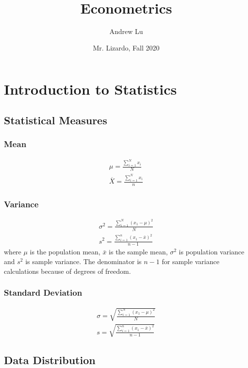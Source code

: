 \documentclass[12pt]{article}
\title{Econometrics}
\author{Andrew Lu}
\date{Mr. Lizardo, Fall 2020}
\numberwithin{equation}{section}
\begin{document}
    \maketitle
    \label{sec:top}
    \tableofcontents

\section{Introduction to Statistics}

\subsection{Statistical Measures}
\subsubsection{Mean}
\begin{align}
    \mu=\frac{\sum\limits_{i=1}^{N}{x_i}}{N} \\
    \overline{X}=\frac{\sum\limits_{i=1}^{N}{x_i}}{n}
\end{align}

\subsubsection{Variance}
\begin{align}
    \sigma^2=\frac{\sum\limits_{i=1}^{N}{(x_1-\mu)^2}}{N} \\
    s^2=\frac{\sum\limits_{i=1}^{n}{(x_1-\bar{x})^2}}{n-1}
\end{align}
where $\mu$ is the population mean, $\bar{x}$ is the sample mean, $\sigma^2$ is population variance and $s^2$ is sample variance. The denominator is $n-1$ for sample variance calculations because of degrees of freedom.

\subsubsection{Standard Deviation}
\begin{align}
    \sigma=\sqrt{\frac{\sum\limits_{i=1}^{N}{(x_1-\mu)^2}}{N}} \\
    s=\sqrt{\frac{\sum\limits_{i=1}^{n}{(x_1-\bar{x})^2}}{n-1}}
\end{align}

\subsection{Data Distribution}
\end{document}
